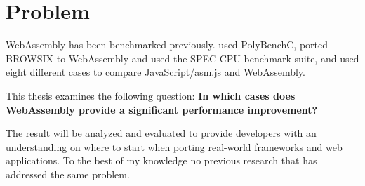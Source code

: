 \section{Problem}
\label{problem}

WebAssembly has been benchmarked previously. \textcite{HaasRossbergSchuffTitzerHolmanGohmanWagnerZakaiBastien2017} used PolyBenchC, \textcite{JangdaPowersGuhaBerger2019} ported BROWSIX \parencite{PowersVilkBerger2017} to WebAssembly and used the SPEC CPU benchmark suite, and \textcite{ReiserBlaser2017} used eight different cases \parencite[Table 1 in][]{ReiserBlaser2017} to compare JavaScript/asm.js and WebAssembly.


This thesis examines the following question: \textbf{In which cases does WebAssembly provide a significant performance improvement?}

The result will be analyzed and evaluated to provide developers with an understanding on where to start when porting real-world frameworks and web applications. To the best of my knowledge no previous research that has addressed the same problem.





